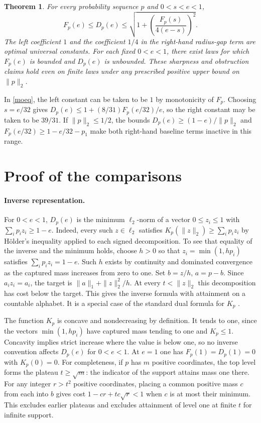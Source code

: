 \documentclass[11pt]{article}
\newtheorem{theorem}{Theorem}
\newcommand{\F}{F_p}
\newcommand{\D}{D_p}
\begin{document}
\begin{theorem}\label{main}
For every probability sequence \(p\) and \(0<s<e<1\),
\begin{equation}\label{ineq}
 \F(e)\le\D(e)\le
 \sqrt{1+\left(\frac{\F(s)}{4(e-s)}\right)^2}.
\end{equation}
The left coefficient \(1\) and the coefficient \(1/4\) in the
right-hand radius-gap term are optimal universal constants.
For each fixed \(0<e<1\), there exist laws for which \(\F(e)\) is
bounded and \(\D(e)\) is unbounded. These sharpness and obstruction
claims hold even on finite laws under any prescribed positive upper
bound on \(\|p\|_2\).
\end{theorem}

In \eqref{moeq}, the left constant can be taken to be \(1\) by monotonicity of
\(\F\). Choosing \(s=e/32\) gives
\(\D(e)\le1+(8/31)\F(e/32)/e\), so the right constant may be taken to
be \(39/31\). If \(\|p\|_2\le1/2\), the bounds
\(\D(e)\ge(1-e)/\|p\|_2\) and
\(\F(e/32)\ge1-e/32-p_1\) make both right-hand baseline terms
inactive in this range.

\section{Proof of the comparisons}
\paragraph{Inverse representation.}
For \(0<e<1\), \(\D(e)\) is the minimum \(\ell_2\)-norm of a vector
\(0\le z_i\le1\) with \(\sum_i p_i z_i\ge1-e\).
Indeed, every such \(z\in\ell_2\) satisfies
\(K_p(\|z\|_2)\ge\sum_i p_i z_i\) by Hölder's inequality applied to
each signed decomposition. To see that equality of the inverse and
the minimum holds, choose \(h>0\) so that \(z_i=\min(1,hp_i)\) satisfies
\(\sum_i p_i z_i=1-e\). Such \(h\) exists by continuity and dominated
convergence as the captured mass increases from zero to one.
Set \(b=z/h\), \(a=p-b\). Since \(a_i z_i=a_i\), the target is
\(\|a\|_1+\|z\|_2^2/h\). At every \(t<\|z\|_2\) this decomposition
has cost below the target. This gives the inverse formula with
attainment on a countable alphabet. It is a special case of the
standard dual formula for \(K_p\) \cite{ms}.

The function \(K_p\) is concave and nondecreasing by definition. It
tends to one, since the vectors \(\min(1,hp_i)\) have captured mass
tending to one and \(K_p\le1\). Concavity implies strict increase
where the value is below one, so no inverse convention affects
\(\D(e)\) for \(0<e<1\). At \(e=1\) one has \(\F(1)=\D(1)=0\)
with \(K_p(0)=0\). For completeness, if \(p\) has \(m\) positive
coordinates, the top level forms the plateau \(t\ge\sqrt m\):
the indicator of the support attains mass one there. For any
integer \(r>t^2\) positive coordinates, placing a common positive
mass \(c\) from each into \(b\) gives cost \(1-cr+tc\sqrt r<1\)
when \(c\) is at most their minimum. This excludes earlier
plateaus and excludes attainment of level one at finite \(t\)
for infinite support.
\end{document}
